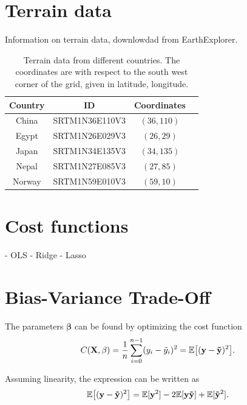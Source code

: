 \appendix
\section{Terrain data}\label{ap:terrain_data}
Information on terrain data, downlowdad from EarthExplorer.
\begin{table}[h]
    \centering
    \begin{tabular}{cccc}
        \hline
        Country & ID & Coordinates \\
        \hline
        China & SRTM1N36E110V3 & $(36, 110)$ \\
        Egypt & SRTM1N26E029V3 & $(26, 29)$ \\
        Japan & SRTM1N34E135V3 & $(34, 135)$ \\
        Nepal & SRTM1N27E085V3 & $(27, 85)$ \\
        Norway & SRTM1N59E010V3 & $(59, 10)$ \\
        \hline
    \end{tabular}
    \caption{Terrain data from different countries. The coordinates are with respect to the south west corner of the grid, given in latitude, longitude.}
    \label{tab:terrain_data}
\end{table}


\section{Cost functions}\label{ap:cost_functions}
- OLS
- Ridge
- Lasso


\section{Bias-Variance Trade-Off}\label{ap:bias_var_eq}
The parameters $\mathbf{\beta}$ can be found by optimizing the cost function
\begin{equation*}
    C(\mathbf{X}, \mathbf{\beta}) = \frac{1}{n} \sum_{i=0}^{n-1} ( y_{i} - \Tilde{y}_{i} )^{2} = \mathbb{E} \big[ ( \mathbf{y} - \mathbf{\Tilde{y}} )^{2} \big] .
\end{equation*}

Assuming linearity, the expression can be written as 
\begin{equation*}
    \mathbb{E} \big[ ( \mathbf{y} - \mathbf{\Tilde{y}} )^{2} \big] = \mathbb{E} [ \mathbf{y}^{2} ] - 2 \mathbb{E} [ \mathbf{y} \mathbf{\Tilde{y}} ] + \mathbb{E} [ \mathbf{\Tilde{y}}^{2} ].
\end{equation*}


